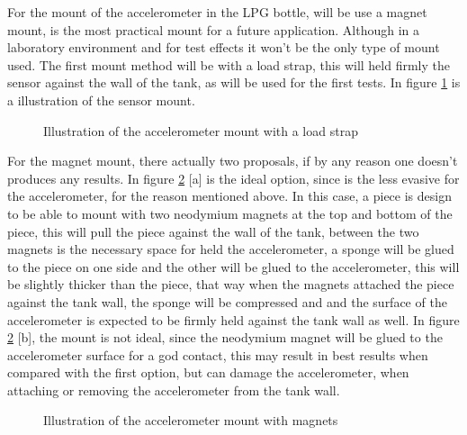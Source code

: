 For the mount of the accelerometer in the LPG bottle, will be use a magnet mount, is the most practical mount for a future application. Although in a laboratory environment and for test effects it won't be the only type of mount used. The first mount method will be with a load strap, this will held firmly the sensor against the wall of the tank, as will be used for the first tests. In figure \ref{fig:mounLoadStrap} is a illustration of the sensor mount.
\begin{figure}[!htb]
    \centering
    \caption{Illustration of the accelerometer mount with a load strap}
    \label{fig:mounLoadStrap}
\end{figure}
For the magnet mount, there actually two proposals, if by any reason one doesn't produces any results. In figure \ref{fig:mounMagnet} [a] is the ideal option, since is the less evasive for the accelerometer, for the reason mentioned above. In this case, a piece is design to be able to mount with two neodymium magnets at the top and bottom of the piece, this will pull the piece against the wall of the tank, between the two magnets is the necessary space for held the accelerometer, a sponge will be glued to the piece on one side and the other will be glued to the accelerometer, this will be slightly thicker than the piece, that way when the magnets attached the piece against the tank wall, the sponge will be compressed and and the surface of the accelerometer is expected to be firmly held against the tank wall as well. In figure \ref{fig:mounMagnet} [b], the mount is not ideal, since the neodymium magnet will be glued to the accelerometer surface for a god contact, this may result in best results when compared with the first option, but can damage the accelerometer, when attaching or removing the accelerometer from the tank wall.
\begin{figure}[!htb]
    \centering
    \caption{Illustration of the accelerometer mount with magnets}
    \label{fig:mounMagnet}
\end{figure}
%

